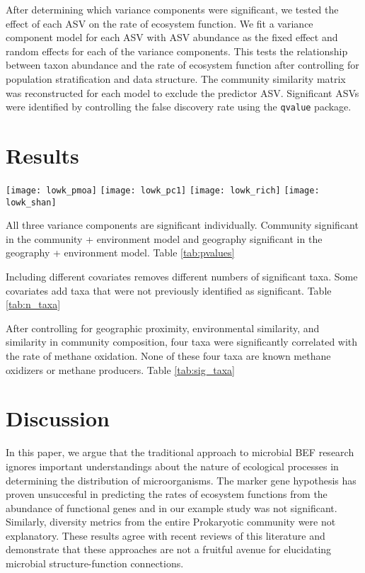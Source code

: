 \documentclass{article}
\begin{document}
After determining which variance components were significant, we tested the
effect of each ASV on the rate of ecosystem function. We fit a variance
component model for each ASV with ASV abundance as the fixed effect and random
effects for each of the variance components. This tests the relationship between
taxon abundance and the rate of ecosystem function after controlling for
population stratification and data structure. The community similarity matrix
was reconstructed for each model to exclude the predictor ASV. 
Significant ASVs were identified by controlling the false discovery rate using
the \texttt{qvalue} package.

\section{Results}


\texttt{[image: lowk\_pmoa]}
\texttt{[image: lowk\_pc1]}
\texttt{[image: lowk\_rich]}
\texttt{[image: lowk\_shan]}

All three variance components are significant individually. Community
significant in the community + environment model and geography
significant in the geography + environment model. Table \ref{tab:pvalues}



Including different covariates removes different numbers of
significant taxa. Some covariates add taxa that were not previously
identified as significant. Table \ref{tab:n_taxa} 



After controlling for geographic proximity, environmental similarity, and
similarity in community composition, four taxa were significantly correlated
with the rate of methane oxidation. None of these four taxa are known methane
oxidizers or methane producers. Table  \ref{tab:sig_taxa}



\section{Discussion}

In this paper, we argue that the traditional approach to microbial BEF research
ignores important understandings about the nature of ecological processes in
determining the distribution of microorganisms. The marker gene hypothesis has
proven unsuccesful in predicting the rates of ecosystem functions from the
abundance of functional genes and in our example study was not significant.
Similarly, diversity metrics from the entire Prokaryotic community were not
explanatory. These results agree with recent reviews of this literature and
demonstrate that these approaches are not a fruitful avenue for elucidating
microbial structure-function connections. 
\end{document}
